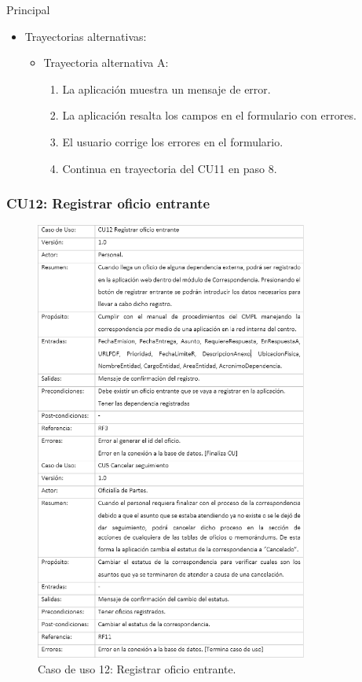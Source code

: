 \begin{UCtrayectoria}{Principal}
\begin{itemize}
	\item Trayectorias alternativas:
	\begin{itemize}
		\item Trayectoria alternativa A:
			\begin{enumerate}
				\item La aplicación muestra un mensaje de error.
				\item La aplicación resalta los campos en el formulario con errores.
				\item El usuario corrige los errores en el formulario.
				\item Continua en trayectoria del CU11 en paso 8.
			\end{enumerate}
	\end{itemize}
\end{itemize}
\newpage
		\subsubsection{CU12: Registrar oficio entrante}
	\begin{figure}[htbp!]
		\centering
			\includegraphics[width=0.8\textwidth]{images/CU/CU12}
		\caption{Caso de uso 12: Registrar oficio entrante.}
		\label{Tabla}
	\end{figure}
	

\end{UCtrayectoria}
